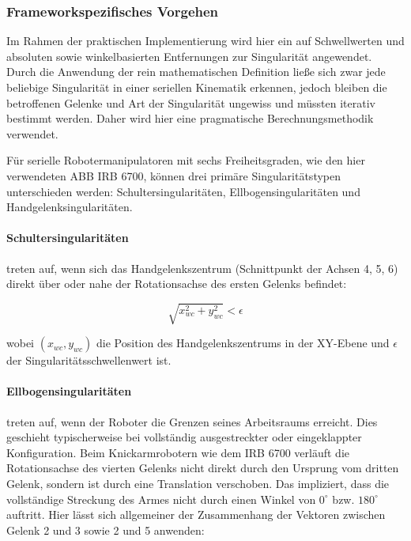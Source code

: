 \subsubsection{Frameworkspezifisches Vorgehen}
Im Rahmen der praktischen Implementierung wird hier ein auf Schwellwerten und
absoluten sowie winkelbasierten Entfernungen zur Singularität angewendet. Durch
die Anwendung der rein mathematischen Definition ließe sich zwar jede beliebige
Singularität in einer seriellen Kinematik erkennen, jedoch bleiben die
betroffenen Gelenke und Art der Singularität ungewiss und müssten iterativ
bestimmt werden. Daher wird hier eine pragmatische Berechnungsmethodik
verwendet.

Für serielle Robotermanipulatoren mit sechs Freiheitsgraden, wie den hier
verwendeten ABB IRB 6700, können drei primäre Singularitätstypen unterschieden
werden: Schultersingularitäten, Ellbogensingularitäten und
Handgelenksingularitäten.

\paragraph{Schultersingularitäten} treten auf, wenn sich das
Handgelenkszentrum (Schnittpunkt der Achsen 4, 5, 6) direkt über oder nahe der
Rotationsachse des ersten Gelenks befindet:

\begin{equation}
  \sqrt{x_{wc}^2 + y_{wc}^2} < \epsilon
  \label{eq:shoulder_singularity}
\end{equation}
 
wobei $(x_{wc}, y_{wc})$ die Position des Handgelenkszentrums in der XY-Ebene
und $\epsilon$ der Singularitätsschwellenwert ist.

\paragraph{Ellbogensingularitäten} treten auf, wenn der Roboter die
Grenzen seines
Arbeitsraums erreicht. Dies geschieht typischerweise bei vollständig
ausgestreckter oder eingeklappter Konfiguration. Beim
Knickarmrobotern wie dem IRB 6700
verläuft die Rotationsachse des vierten Gelenks nicht direkt durch
den Ursprung vom
dritten Gelenk, sondern ist durch eine Translation verschoben. Das impliziert,
dass die vollständige Streckung des Armes nicht durch einen Winkel
von $0^\circ$ bzw.
$180^\circ$ auftritt. Hier lässt sich allgemeiner der Zusammenhang der Vektoren
zwischen Gelenk 2 und 3 sowie 2 und 5 anwenden:

